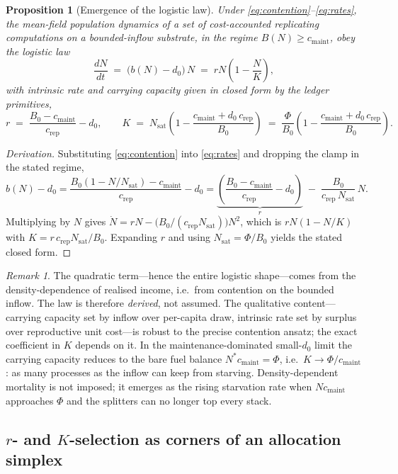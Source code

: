 \documentclass[11pt]{article}
\theoremstyle{plain}
\newtheorem{proposition}{Proposition}
\theoremstyle{definition}
\theoremstyle{remark}
\newtheorem*{remark}{Remark}
\newcommand{\cmaint}{c_{\mathrm{maint}}}
\newcommand{\crep}{c_{\mathrm{rep}}}
\begin{document}
\begin{proposition}[Emergence of the logistic law]
\label{prop:logistic}
Under \eqref{eq:contention}--\eqref{eq:rates}, the mean-field population
dynamics of a set of cost-accounted replicating computations on a bounded-inflow
substrate, in the regime $B(N)\ge \cmaint$, obey the logistic
law~\cite{verhulst1838}
\[
  \frac{dN}{dt} \;=\; \big(b(N)-d_0\big)\,N \;=\; rN\!\left(1 - \frac{N}{K}\right),
\]
with intrinsic rate and carrying capacity given in closed form by the ledger
primitives,
\[
  r \;=\; \frac{B_0 - \cmaint}{\crep} - d_0,
  \qquad
  K \;=\; N_{\mathrm{sat}}\left(1 - \frac{\cmaint + d_0\,\crep}{B_0}\right)
        \;=\; \frac{\Phi}{B_0}\left(1 - \frac{\cmaint + d_0\,\crep}{B_0}\right).
\]
\end{proposition}

\begin{proof}[Derivation]
Substituting \eqref{eq:contention} into \eqref{eq:rates} and dropping the clamp
in the stated regime,
\[
  b(N) - d_0
  = \frac{B_0(1-N/N_{\mathrm{sat}}) - \cmaint}{\crep} - d_0
  = \underbrace{\left(\frac{B_0-\cmaint}{\crep}-d_0\right)}_{r}
    \;-\; \frac{B_0}{\crep\,N_{\mathrm{sat}}}\,N .
\]
Multiplying by $N$ gives $\dot N = rN - \big(B_0/(\crep N_{\mathrm{sat}})\big)N^2$,
which is $rN(1-N/K)$ with $K = r\,\crep N_{\mathrm{sat}}/B_0$. Expanding $r$ and
using $N_{\mathrm{sat}}=\Phi/B_0$ yields the stated closed form.
\end{proof}

\begin{remark}
The quadratic term---hence the entire logistic shape---comes from the
density-dependence of realised income, i.e.\ from contention on the bounded
inflow. The law is therefore \emph{derived}, not assumed. The qualitative
content---carrying capacity set by inflow over per-capita draw, intrinsic rate
set by surplus over reproductive unit cost---is robust to the precise contention
ansatz; the exact coefficient in $K$ depends on it. In the maintenance-dominated
small-$d_0$ limit the carrying capacity reduces to the bare fuel balance
$N^\ast\cmaint=\Phi$, i.e.\ $K\to\Phi/\cmaint$: as many processes as the inflow
can keep from starving. Density-dependent mortality is not imposed; it emerges
as the rising starvation rate when $N\cmaint$ approaches $\Phi$ and the splitters
can no longer top every stack.
\end{remark}

\subsection{\texorpdfstring{$r$}{r}- and \texorpdfstring{$K$}{K}-selection as corners of an allocation simplex}
\end{document}
